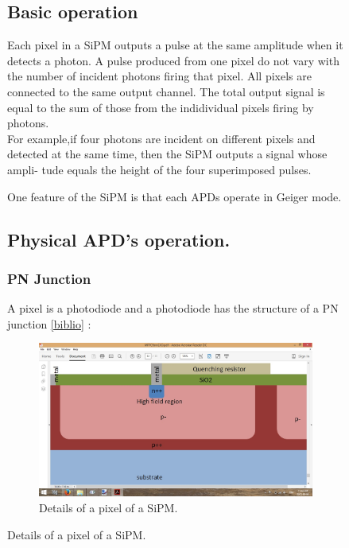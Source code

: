 \begin{figure}[!hbtp]
  \subsection{Basic operation}\label{basic operation}
  
  Each pixel in a SiPM outputs a pulse at the same amplitude when it detects a photon. 
  A pulse produced from one pixel do not vary with the number of incident photons firing that pixel. 
  All pixels are connected to the same output channel. The total output signal is equal to the sum of those from the indidividual pixels 
  firing by photons.
  \\
  
  For example,if four photons are incident on different pixels and detected at the same time, then the SiPM outputs a signal whose ampli-
  tude equals the height of the four superimposed pulses.

 
  One feature of the SiPM is that each APDs operate in Geiger mode.
  
  \subsection{Physical APD's operation.}
  
  \subsubsection{PN Junction}
  A pixel is a photodiode and a photodiode has the structure of a PN junction \ref{biblio} :
  
  \begin{figure}[!hbtp]
  \centering
  \includegraphics[trim=1.5cm 2cm 5.5cm 3cm, clip=true,totalheight=.4\textwidth]{Pictures/blabla/PN_junction.jpg}%
  \caption{Details of a pixel of a SiPM.}
  \label{fig:PN_junction}
  \end{figure}
  

\end{figure}
